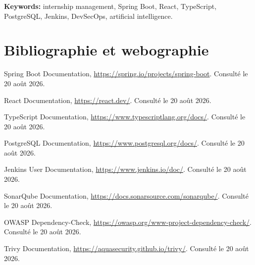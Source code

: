 \documentclass[11pt,a4paper,oneside]{report}
\begin{document}
\noindent\textbf{Keywords:} internship management, Spring Boot, React, TypeScript, PostgreSQL, Jenkins, DevSecOps, artificial intelligence.

\tableofcontents
\listoffigures
\listoftables
\clearpage
{}






\chapter*{Bibliographie et webographie}
\begin{enumerate}[label={[\arabic*]}]
  \item Spring Boot Documentation, \url{https://spring.io/projects/spring-boot}. Consulté le 20 août 2026.
  \item React Documentation, \url{https://react.dev/}. Consulté le 20 août 2026.
  \item TypeScript Documentation, \url{https://www.typescriptlang.org/docs/}. Consulté le 20 août 2026.
  \item PostgreSQL Documentation, \url{https://www.postgresql.org/docs/}. Consulté le 20 août 2026.
  \item Jenkins User Documentation, \url{https://www.jenkins.io/doc/}. Consulté le 20 août 2026.
  \item SonarQube Documentation, \url{https://docs.sonarsource.com/sonarqube/}. Consulté le 20 août 2026.
  \item OWASP Dependency-Check, \url{https://owasp.org/www-project-dependency-check/}. Consulté le 20 août 2026.
  \item Trivy Documentation, \url{https://aquasecurity.github.io/trivy/}. Consulté le 20 août 2026. 
\end{enumerate}
\end{document}
